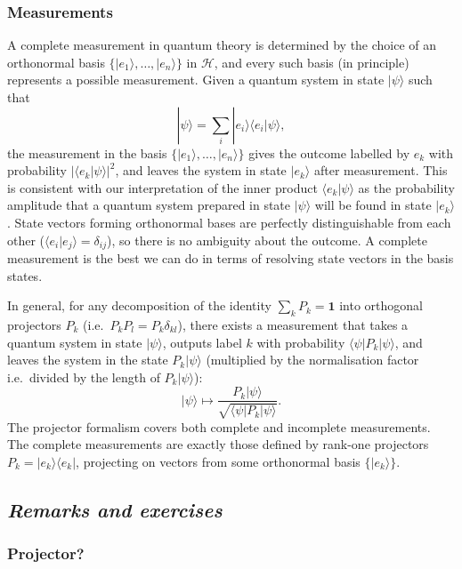 \documentclass[fleqn,a4paper]{article}
\theoremstyle{definition}
\theoremstyle{definition}
\theoremstyle{definition}
\theoremstyle{definition}
\theoremstyle{remark}
\begin{document}
\hypertarget{measurements-1}{%
\subsubsection*{Measurements}\label{measurements-1}}

A complete measurement in quantum theory is determined by the choice of an orthonormal basis \(\{|e_1\rangle,\ldots,|e_n\rangle\}\) in \(\mathcal{H}\), and every such basis (in principle) represents a possible measurement.
Given a quantum system in state \(|\psi\rangle\) such that
\[
  |\psi\rangle = \sum_i |e_i\rangle\langle e_i|\psi\rangle,
\]
the measurement in the basis \(\{|e_1\rangle,\ldots,|e_n\rangle\}\) gives the outcome labelled by \(e_k\) with probability \(|\langle e_k|\psi\rangle|^2\), and leaves the system in state \(|e_k\rangle\) after measurement.
This is consistent with our interpretation of the inner product \(\langle e_k|\psi\rangle\) as the probability amplitude that a quantum system prepared in state \(|\psi\rangle\) will be found in state \(|e_k\rangle\).
State vectors forming orthonormal bases are perfectly distinguishable from each other (\(\langle e_i|e_j\rangle=\delta_{ij}\)), so there is no ambiguity about the outcome.
A complete measurement is the best we can do in terms of resolving state vectors in the basis states.

In general, for any decomposition of the identity \(\sum_k P_k=\mathbf{1}\) into orthogonal projectors \(P_k\) (i.e.~\(P_kP_l = P_k\delta_{kl}\)), there exists a measurement that takes a quantum system in state \(|\psi\rangle\), outputs label \(k\) with probability \(\langle\psi|P_k|\psi\rangle\), and leaves the system in the state \(P_k|\psi\rangle\) (multiplied by the normalisation factor i.e.~divided by the length of \(P_k|\psi\rangle\)):
\[
  |\psi\rangle
  \mapsto
  \frac{P_k|\psi\rangle}{\sqrt{\langle\psi|P_k|\psi\rangle}}.
\]
The projector formalism covers both complete and incomplete measurements.
The complete measurements are exactly those defined by rank-one projectors \(P_k=|e_k\rangle\langle e_k|\), projecting on vectors from some orthonormal basis \(\{|e_k\rangle\}\).

\hypertarget{remarks-and-exercises-measurement}{%
\subsection{\texorpdfstring{\emph{Remarks and exercises}}{Remarks and exercises}}\label{remarks-and-exercises-measurement}}

\hypertarget{projector}{%
\subsubsection{Projector?}\label{projector}}
\end{document}
